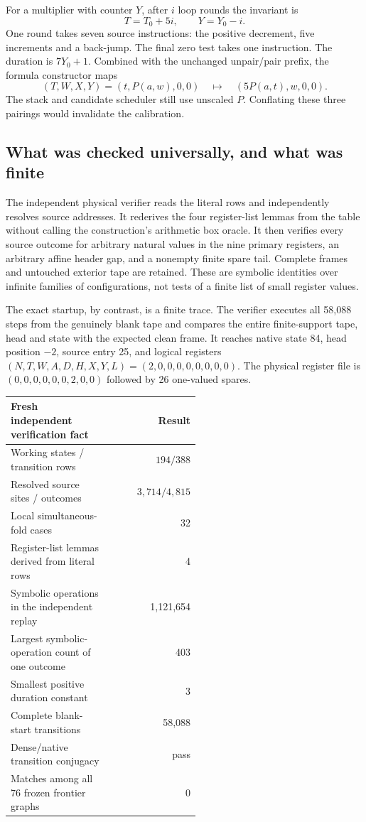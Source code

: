 \documentclass[11pt]{article}
\theoremstyle{definition}\newtheorem{definition}[theorem]{Definition}
\begin{document}
For a multiplier with counter $Y$, after $i$ loop rounds the invariant is
\[
                       T=T_0+5i,\qquad Y=Y_0-i.
\]
One round takes seven source instructions: the positive decrement,
five increments and a back-jump. The final zero test takes one instruction.
The duration is $7Y_0+1$. Combined with the unchanged unpair/pair prefix,
the formula constructor maps
\[
 (T,W,X,Y)=(t,P(a,w),0,0)
       \quad\longmapsto\quad (5P(a,t),w,0,0).
\]
The stack and candidate scheduler still use unscaled $P$. Conflating
these three pairings would invalidate the calibration.

\subsection{What was checked universally, and what was finite}

The independent physical verifier reads the literal rows and independently
resolves source addresses. It rederives the four register-list lemmas
from the table without calling the construction's arithmetic box oracle.
It then verifies every source outcome for arbitrary natural values in
the nine primary registers, an arbitrary affine header gap, and a nonempty
finite spare tail. Complete frames and untouched exterior tape are retained.
These are symbolic identities over infinite families of configurations,
not tests of a finite list of small register values.

The exact startup, by contrast, is a finite trace. The verifier executes
all 58,088 steps from the genuinely blank tape and compares the entire
finite-support tape, head and state with the expected clean frame. It
reaches native state 84, head position $-2$, source entry 25, and logical
registers $(N,T,W,A,D,H,X,Y,L)=(2,0,0,0,0,0,0,0,0)$.
The physical register file is
$(0,0,0,0,0,0,2,0,0)$ followed by 26 one-valued spares.

\begin{center}
\begin{tabular}{@{}p{0.53\linewidth}r@{}}
\toprule
Fresh independent verification fact & Result\\
\midrule
Working states / transition rows & $194/388$\\
Resolved source sites / outcomes & $3,714/4,815$\\
Local simultaneous-fold cases & 32\\
Register-list lemmas derived from literal rows & 4\\
Symbolic operations in the independent replay & 1,121,654\\
Largest symbolic-operation count of one outcome & 403\\
Smallest positive duration constant & 3\\
Complete blank-start transitions & 58,088\\
Dense/native transition conjugacy & pass\\
Matches among all 76 frozen frontier graphs & 0\\
\bottomrule
\end{tabular}
\end{center}
\end{document}
